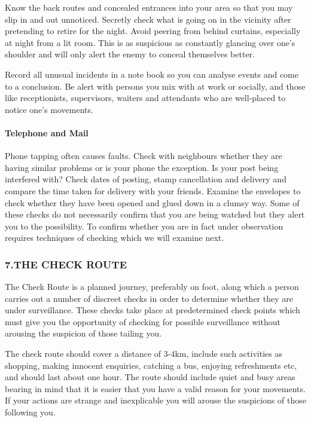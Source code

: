 Know the back routes and concealed entrances into your area so that you
may slip in and out unnoticed. Secretly check what is going on in the
vicinity after pretending to retire for the night. Avoid peering from
behind curtains, especially at night from a lit room. This is as
suspicious as constantly glancing over one's shoulder and will only
alert the enemy to conceal themselves better.

Record all unusual incidents in a note book so you can analyse events
and come to a conclusion. Be alert with persons you mix with at work or
socially, and those like receptionists, supervisors, waiters and
attendants who are well-placed to notice one's movements.

\paragraph{Telephone and Mail}

Phone tapping often causes faults. Check with neighbours whether they
are having similar problems or is your phone the exception. Is your post
being interfered with? Check dates of posting, stamp cancellation and
delivery and compare the time taken for delivery with your friends.
Examine the envelopes to check whether they have been opened and glued
down in a clumsy way. Some of these checks do not necessarily confirm
that you are being watched but they alert you to the possibility. To
confirm whether you are in fact under observation requires techniques of
checking which we will examine next.

\subsubsection{7.THE CHECK ROUTE}

The Check Route is a planned journey, preferably on foot, along which a
person carries out a number of discreet checks in order to determine
whether they are under surveillance. These checks take place at
predetermined check points which must give you the opportunity of
checking for possible surveillance without arousing the suspicion of
those tailing you.

The check route should cover a distance of 3-4km, include such
activities as shopping, making innocent enquiries, catching a bus,
enjoying refreshments etc, and should last about one hour. The route
should include quiet and busy areas bearing in mind that it is easier
that you have a valid reason for your movements. If your actions are
strange and inexplicable you will arouse the suspicions of those
following you.

